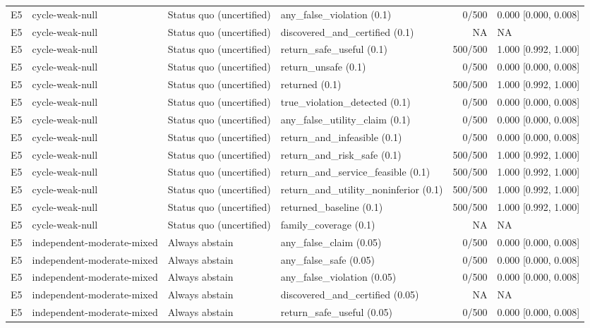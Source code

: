 \begin{longtable}{p{.04\linewidth}p{.18\linewidth}p{.19\linewidth}p{.16\linewidth}r p{.21\linewidth}}
E5 & cycle-weak-null & Status quo (uncertified) & any\_false\_violation (0.1) & 0/500 & 0.000 [0.000, 0.008]\\
E5 & cycle-weak-null & Status quo (uncertified) & discovered\_and\_certified (0.1) & NA & NA\\
E5 & cycle-weak-null & Status quo (uncertified) & return\_safe\_useful (0.1) & 500/500 & 1.000 [0.992, 1.000]\\
E5 & cycle-weak-null & Status quo (uncertified) & return\_unsafe (0.1) & 0/500 & 0.000 [0.000, 0.008]\\
E5 & cycle-weak-null & Status quo (uncertified) & returned (0.1) & 500/500 & 1.000 [0.992, 1.000]\\
E5 & cycle-weak-null & Status quo (uncertified) & true\_violation\_detected (0.1) & 0/500 & 0.000 [0.000, 0.008]\\
E5 & cycle-weak-null & Status quo (uncertified) & any\_false\_utility\_claim (0.1) & 0/500 & 0.000 [0.000, 0.008]\\
E5 & cycle-weak-null & Status quo (uncertified) & return\_and\_infeasible (0.1) & 0/500 & 0.000 [0.000, 0.008]\\
E5 & cycle-weak-null & Status quo (uncertified) & return\_and\_risk\_safe (0.1) & 500/500 & 1.000 [0.992, 1.000]\\
E5 & cycle-weak-null & Status quo (uncertified) & return\_and\_service\_feasible (0.1) & 500/500 & 1.000 [0.992, 1.000]\\
E5 & cycle-weak-null & Status quo (uncertified) & return\_and\_utility\_noninferior (0.1) & 500/500 & 1.000 [0.992, 1.000]\\
E5 & cycle-weak-null & Status quo (uncertified) & returned\_baseline (0.1) & 500/500 & 1.000 [0.992, 1.000]\\
E5 & cycle-weak-null & Status quo (uncertified) & family\_coverage (0.1) & NA & NA\\
E5 & independent-moderate-mixed & Always abstain & any\_false\_claim (0.05) & 0/500 & 0.000 [0.000, 0.008]\\
E5 & independent-moderate-mixed & Always abstain & any\_false\_safe (0.05) & 0/500 & 0.000 [0.000, 0.008]\\
E5 & independent-moderate-mixed & Always abstain & any\_false\_violation (0.05) & 0/500 & 0.000 [0.000, 0.008]\\
E5 & independent-moderate-mixed & Always abstain & discovered\_and\_certified (0.05) & NA & NA\\
E5 & independent-moderate-mixed & Always abstain & return\_safe\_useful (0.05) & 0/500 & 0.000 [0.000, 0.008]\\

\end{longtable}
